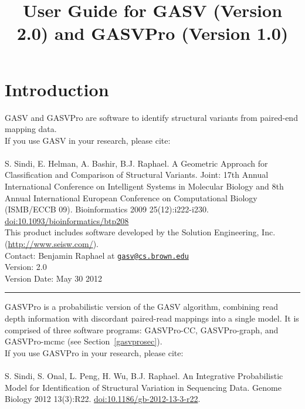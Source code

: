 \documentclass[11pt]{article}
\title{User Guide for GASV (Version 2.0) and GASVPro (Version 1.0)}
\date{}                                           %
\newcommand{\sectionline}{
  \nointerlineskip \vspace{\baselineskip}
  \hspace{\fill}\rule{0.3\linewidth}{.7pt}\hspace{\fill}
  \par\nointerlineskip \vspace{\baselineskip}
}
\begin{document}

\maketitle

\tableofcontents
\clearpage

\section{Introduction}

GASV and GASVPro are software to identify structural variants from paired-end mapping data. \\

\noindent If you use GASV in your research, please cite: \\ \\
S. Sindi, E. Helman, A. Bashir, B.J. Raphael. A Geometric Approach for
Classification and Comparison of Structural Variants. Joint: 17th
Annual International Conference on Intelligent Systems in Molecular
Biology and 8th Annual International European Conference on
Computational Biology (ISMB/ECCB 09).  Bioinformatics 2009
25(12):i222-i230. \href{http://dx.doi.org/10.1093/bioinformatics/btp208}{doi:10.1093/bioinformatics/btp208}\\

\noindent This product includes software developed by the Solution Engineering,
Inc. (\url{http://www.seisw.com/}).\\

\noindent Contact: Benjamin Raphael at \href{mailto:gasv@cs.brown.edu}{\nolinkurl{gasv@cs.brown.edu}}\\

\noindent Version: 2.0 \\
\noindent Version Date: May 30 2012 

\sectionline

\noindent GASVPro is a probabilistic version of the GASV algorithm, combining read depth information with discordant paired-read mappings into a single model. It is comprised of three software programs: GASVPro-CC, GASVPro-graph, and GASVPro-mcmc (see Section~\ref{gasvprosec}). \\ 

\noindent If you use GASVPro in your research, please cite: \\ \\ 
S. Sindi, S. Onal, L. Peng, H. Wu, B.J. Raphael. An Integrative Probabilistic Model for Identification of Structural Variation in Sequencing Data. Genome Biology 2012 13(3):R22. \href{http://dx.doi.org/10.1186/gb-2012-13-3-r22}{doi:10.1186/gb-2012-13-3-r22}.\\
\end{document}

